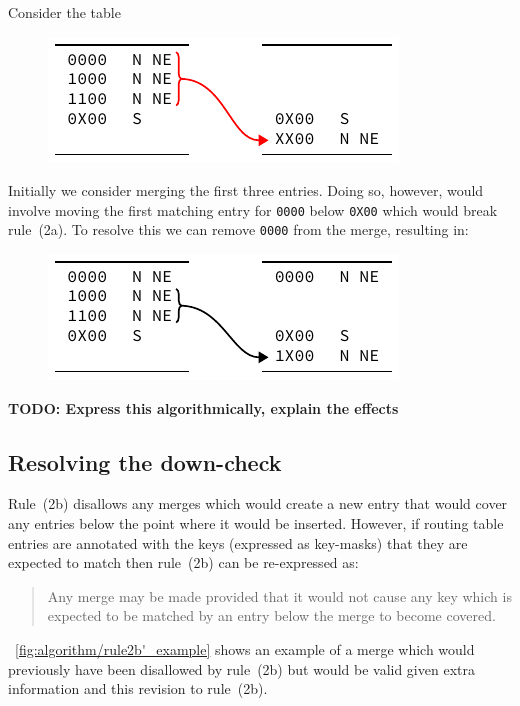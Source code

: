 \documentclass[conference]{IEEEtran}
\newcommand{\mytt}[1]{\texttt{\footnotesize#1}}
\begin{document}
  Consider the table

  \begin{figure}[H]
    \centering
    \includegraphics{figures/upcheck_resolve_example_1}
  \end{figure}

  \noindent Initially we consider merging the first three entries.
  Doing so, however, would involve moving the first matching entry for \mytt{0000} below \mytt{0X00} which would break rule~(2a).
  To resolve this we can remove \mytt{0000} from the merge, resulting in:

  \begin{figure}[H]
    \centering
    \includegraphics{figures/upcheck_resolve_example_2}
  \end{figure}

  \textbf{TODO: Express this algorithmically, explain the effects}

  \subsection{Resolving the down-check}
  
  Rule~(2b) disallows any merges which would create a new entry that would cover any entries below the point where it would be inserted.
  However, if routing table entries are annotated with the keys (expressed as key-masks) that they are expected to match then rule~(2b) can be re-expressed as:

  \begin{quote}
    Any merge may be made provided that it would not cause any key which is expected to be matched by an entry below the merge to become covered.
  \end{quote}

  \figurename~\ref{fig:algorithm/rule2b'_example} shows an example of a merge which would previously have been disallowed by rule~(2b) but would be valid given extra information and this revision to rule~(2b).
\end{document}
